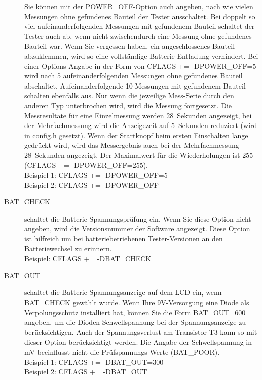 \begin{description}
Sie können mit der POWER\_OFF-Option auch angeben, nach wie vielen Messungen ohne gefundenes Bauteil der Tester ausschaltet.
Bei doppelt so viel aufeinanderfolgenden Messungen mit gefundenem Bauteil schaltet der Tester auch ab,
wenn nicht zwischendurch eine Messung ohne gefundenes Bauteil war.
Wenn Sie vergessen haben, ein angeschlossenes Bauteil abzuklemmen, wird so eine vollständige Batterie-Entladung
verhindert.
Bei einer Options-Angabe in der Form von CFLAGS += -DPOWER\_OFF=5 wird nach 5 aufeinanderfolgenden Messungen ohne
gefundenes Bauteil abschaltet. Aufeinanderfolgende 10 Messungen mit gefundenem Bauteil schalten ebenfalls aus.
Nur wenn die jeweilige Mess-Serie durch den anderen Typ unterbrochen wird, wird die Messung fortgesetzt.
Die Messresultate für eine Einzelmessung werden 28~Sekunden angezeigt, bei der Mehrfachmessung wird die
Anzeigezeit auf 5~Sekunden reduziert (wird in config.h gesetzt).
Wenn der Startknopf beim ersten Einschalten lange gedrückt wird, wird das Messergebnis
 auch bei der Mehrfachmessung 28~Sekunden angezeigt.
Der Maximalwert für die Wiederholungen ist 255 (CFLAGS += -DPOWER\_OFF=255).\\
Beispiel 1: CFLAGS += -DPOWER\_OFF=5 \\
Beispiel 2: CFLAGS += -DPOWER\_OFF 

  \item[BAT\_CHECK] schaltet die Batterie-Spannungsprüfung ein.
 Wenn Sie diese Option nicht angeben, wird die Versionsnummer der Software angezeigt.
Diese Option ist hilfreich um bei batteriebetriebenen Tester-Versionen an den Batteriewechsel zu erinnern.\\
Beispiel: CFLAGS += -DBAT\_CHECK

  \item[BAT\_OUT] schaltet die Batterie-Spannungsanzeige auf dem LCD ein, wenn BAT\_CHECK gewählt wurde.
 Wenn Ihre 9V-Versorgung eine Diode als Verpolungsschutz installiert hat, können Sie 
die Form BAT\_OUT=600 angeben, um die Dioden-Schwellspannung 
bei der Spannungsanzeige zu berücksichtigen.
Auch der Spannungsverlust am Transistor T3 kann so mit dieser Option berücksichtigt werden.
Die Angabe der Schwellspannung in mV beeinflusst nicht die Prüf\-span\-nungs Werte (BAT\_POOR).\\
Beispiel 1: CFLAGS += -DBAT\_OUT=300 \\
Beispiel 2: CFLAGS += -DBAT\_OUT


\end{description}
